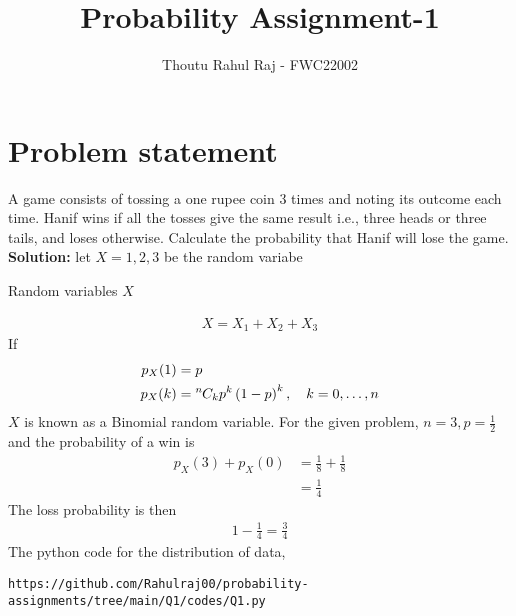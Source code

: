 \documentclass{article}
\newcommand*{\permcomb}[4][0mu]{{{}^{#3}\mkern#1#2_{#4}}}
\newcommand*{\comb}[1][-1mu]{\permcomb[#1]{C}}
\newcommand{\solution}{\noindent \textbf{Solution: }}
\begin{document}
\newcommand{\BEQA}{\begin{eqnarray}}
\newcommand{\EEQA}{\end{eqnarray}}
\newcommand{\define}{\stackrel{\triangle}{=}}
\raggedbottom
\setlength{\parindent}{0pt}
\providecommand{\mbf}{\mathbf}
\providecommand{\pr}[1]{\ensuremath{\Pr\left(#1\right)}}
\providecommand{\qfunc}[1]{\ensuremath{Q\left(#1\right)}}
\providecommand{\sbrak}[1]{\ensuremath{{}\left[#1\right]}}
\providecommand{\lsbrak}[1]{\ensuremath{{}\left[#1\right.}}
\providecommand{\rsbrak}[1]{\ensuremath{{}\left.#1\right]}}
\providecommand{\brak}[1]{\ensuremath{\left(#1\right)}}
\providecommand{\lbrak}[1]{\ensuremath{\left(#1\right.}}
\providecommand{\rbrak}[1]{\ensuremath{\left.#1\right)}}
\providecommand{\cbrak}[1]{\ensuremath{\left\{#1\right\}}}
\providecommand{\lcbrak}[1]{\ensuremath{\left\{#1\right.}}
\providecommand{\rcbrak}[1]{\ensuremath{\left.#1\right\}}}
\theoremstyle{remark}
\title{Probability Assignment-1}
\author{\Large Thoutu Rahul Raj - FWC22002}
\date{}
\maketitle
\setcounter{enumi}{3}
\setcounter{enumii}{6}
\section*{\large Problem statement}
A game consists of tossing a one rupee coin 3 times and noting its outcome each time. Hanif wins if all the tosses give the same result i.e., three heads or three tails, and loses otherwise. Calculate the probability that Hanif will lose the game.\\

\solution
let $X={1,2,3}$ be the random variabe  
\begin{table}[h]

\caption{Random variables $X$}\label{table:1}
\end{table}

\begin{align}
X = X_1+X_2+X_3	
\end{align}
If 
\begin{align}
p_X(1) &= p\\
p_X(k) &= \comb{n}{k}p^k\brak{1-p}^k, \quad k = 0,\dots, n
\end{align}
$X$ is known as a Binomial random variable.  For the given problem, $n = 3, p = \frac{1}{2}$ and the probability of a win is 
\begin{align}
p_X(3) + p_X(0) &= \frac{1}{8}+\frac{1}{8}
\\
&= \frac{1}{4}
\end{align}
The loss probability is then
\begin{align}
1-\frac{1}{4} = \frac{3}{4}
\end{align}
The python code for the distribution of data,\\
\begin{lstlisting}
https://github.com/Rahulraj00/probability-assignments/tree/main/Q1/codes/Q1.py 
\end{lstlisting}   	
\end{document}
